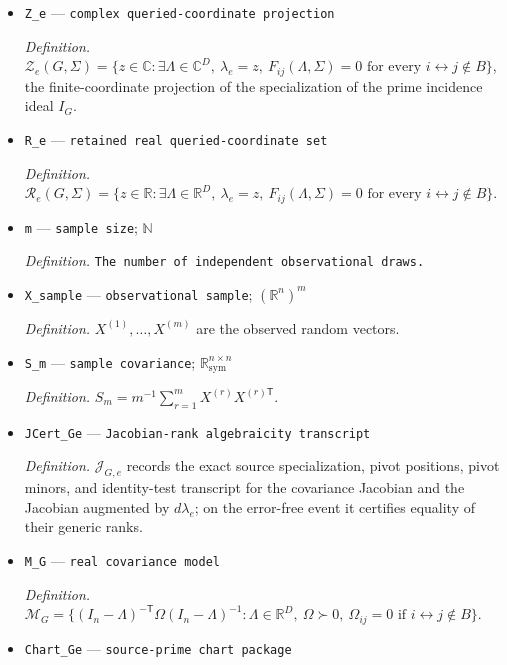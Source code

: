 \documentclass{article}
\begin{document}
\begin{itemize}
  \item \texttt{Z\_\allowbreak{}e} --- \texttt{complex queried-\allowbreak{}coordinate projection}
  \par\smallskip\noindent\emph{Definition.} \(\mathcal Z_e(G,\Sigma)=\{z\in\mathbb C:\exists\Lambda\in\mathbb C^D,\ \lambda_e=z,\ F_{ij}(\Lambda,\Sigma)=0\text{ for every }i\leftrightarrow j\notin B\}\), the finite-coordinate projection of the specialization of the prime incidence ideal \(I_G\).
  \item \texttt{R\_\allowbreak{}e} --- \texttt{retained real queried-\allowbreak{}coordinate set}
  \par\smallskip\noindent\emph{Definition.} \(\mathcal R_e(G,\Sigma)=\{z\in\mathbb R:\exists\Lambda\in\mathbb R^D,\ \lambda_e=z,\ F_{ij}(\Lambda,\Sigma)=0\text{ for every }i\leftrightarrow j\notin B\}\).
  \item \texttt{m} --- \texttt{sample size}; \(\mathbb N\)
  \par\smallskip\noindent\emph{Definition.} \texttt{The number of independent observational draws.}
  \item \texttt{X\_\allowbreak{}sample} --- \texttt{observational sample}; \((\mathbb R^n)^m\)
  \par\smallskip\noindent\emph{Definition.} \(X^{(1)},\ldots,X^{(m)}\) are the observed random vectors.
  \item \texttt{S\_\allowbreak{}m} --- \texttt{sample covariance}; \(\mathbb R^{n\times n}_{\mathrm{sym}}\)
  \par\smallskip\noindent\emph{Definition.} \(S_m=m^{-1}\sum_{r=1}^m X^{(r)}X^{(r)\mathsf T}\).
  \item \texttt{JCert\_\allowbreak{}Ge} --- \texttt{Jacobian-\allowbreak{}rank algebraicity transcript}
  \par\smallskip\noindent\emph{Definition.} \(\mathcal J_{G,e}\) records the exact source specialization, pivot positions, pivot minors, and identity-test transcript for the covariance Jacobian and the Jacobian augmented by \(d\lambda_e\); on the error-free event it certifies equality of their generic ranks.
  \item \texttt{M\_\allowbreak{}G} --- \texttt{real covariance model}
  \par\smallskip\noindent\emph{Definition.} \(\mathcal M_G=\{(I_n-\Lambda)^{-\mathsf T}\Omega(I_n-\Lambda)^{-1}:\Lambda\in\mathbb R^D,\ \Omega\succ0,\ \Omega_{ij}=0\text{ if }i\leftrightarrow j\notin B\}\).
  \item \texttt{Chart\_\allowbreak{}Ge} --- \texttt{source-\allowbreak{}prime chart package}

\end{itemize}
\end{document}
